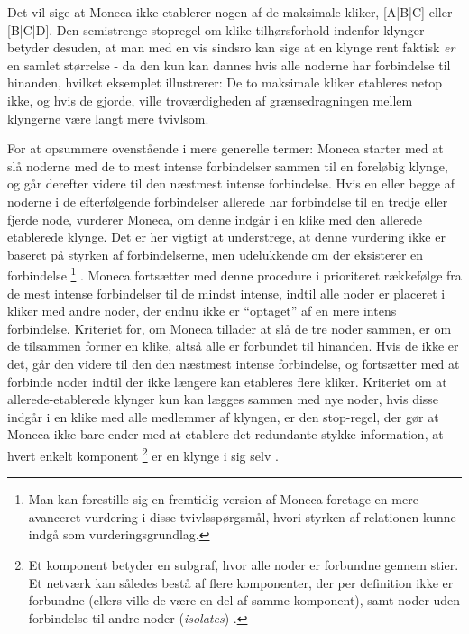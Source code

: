 Det vil sige at Moneca ikke etablerer nogen af de maksimale kliker, [A|B|C] eller [B|C|D]. Den semistrenge stopregel om klike-tilhørsforhold indenfor klynger betyder desuden, at man med en vis sindsro kan sige at en klynge rent faktisk \emph{er} en samlet størrelse - da den kun kan dannes hvis alle noderne har forbindelse til hinanden, hvilket eksemplet illustrerer: De to maksimale kliker etableres netop ikke, og hvis de gjorde, ville troværdigheden af grænsedragningen mellem klyngerne være langt mere tvivlsom.

For at opsummere ovenstående i mere generelle termer: Moneca starter med at slå noderne med de to mest intense forbindelser sammen til en foreløbig klynge, og går derefter videre til den næstmest intense forbindelse. Hvis en eller begge af noderne i de efterfølgende forbindelser allerede har forbindelse til en tredje eller fjerde node, vurderer Moneca, om denne indgår i en klike med den allerede etablerede klynge. Det er her vigtigt at understrege, at denne vurdering ikke er baseret på styrken af forbindelserne, men udelukkende om der eksisterer en forbindelse%
%
\footnote{Man kan forestille sig en fremtidig version af Moneca foretage en mere avanceret vurdering i disse tvivlsspørgsmål, hvori styrken af relationen kunne indgå som vurderingsgrundlag.}
%
. Moneca fortsætter med denne procedure i prioriteret rækkefølge fra de mest intense forbindelser til de mindst intense, indtil alle noder er placeret i kliker med andre noder, der endnu ikke er “optaget” af en mere intens forbindelse. Kriteriet for, om Moneca tillader at slå de tre noder sammen, er om de tilsammen former en klike, altså alle er forbundet til hinanden. Hvis de ikke er det, går den videre til den den næstmest intense forbindelse, og fortsætter med at forbinde noder indtil der ikke længere kan etableres flere kliker. Kriteriet om at allerede-etablerede klynger kun kan lægges sammen med nye noder, hvis disse indgår i en klike med alle medlemmer af klyngen, er den stop-regel, der gør at Moneca ikke bare ender med at etablere det redundante stykke information, at hvert enkelt komponent%
%
\footnote{Et komponent betyder en subgraf, hvor alle noder er forbundne gennem stier. Et netværk kan således bestå af flere komponenter, der per definition ikke er forbundne (ellers ville de være en del af samme komponent), samt noder uden forbindelse til andre noder (\emph{isolates}) \parencite[100]{Scott2000}.}%
er en klynge i sig selv \parencite[8]{Touboel2015}. 

